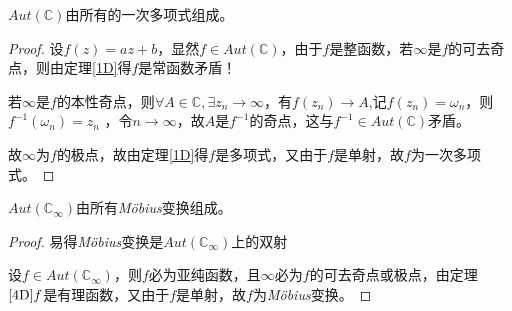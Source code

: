     \begin{theorem}\label{5D}
         $Aut(\mathbb{C})$由所有的一次多项式组成。
    \end{theorem}
    \begin{proof}
    设$ f \left(z \right) = az+b $，显然$f \in  Aut(\mathbb{C}) $，由于$f$是整函数，若$\infty$是$f$的可去奇点，则由定理\ref{1D}得$f$是常函数矛盾！\par
    若$\infty$是$f$的本性奇点，则$\forall A \in \mathbb{C} ,\exists z_n \rightarrow \infty $，有$ f\left(z_n \right) \rightarrow A $,记$ f\left(z_n \right) = \omega_n$，则$f^{-1}(\omega_n) = z_n$ ，令$ n \rightarrow \infty$，故$A$是$ f^{-1}$的奇点，这与$f^{-1} \in  Aut(\mathbb{C})$矛盾。\par
    故$ \infty $为$f$的极点，故由定理\ref{1D}得$f$是多项式，又由于$f$是单射，故$f$为一次多项式。
 	\end{proof}
    \begin{theorem}\label{6D}
    $Aut( \mathbb{C}_{\infty} )$由所有\emph{Möbius}变换组成。
    \end{theorem}
    \begin{proof}
    易得\emph{Möbius}变换是$Aut( \mathbb{C}_{\infty} )$上的双射\par
    设$f \in Aut( \mathbb{C}_{\infty})$，则$f$必为亚纯函数，且$\infty $必为$f$的可去奇点或极点，由定理$\ref{4D} f $是有理函数，又由于$f$是单射，故$f$为\emph{Möbius}变换。
 	\end{proof} 
  
